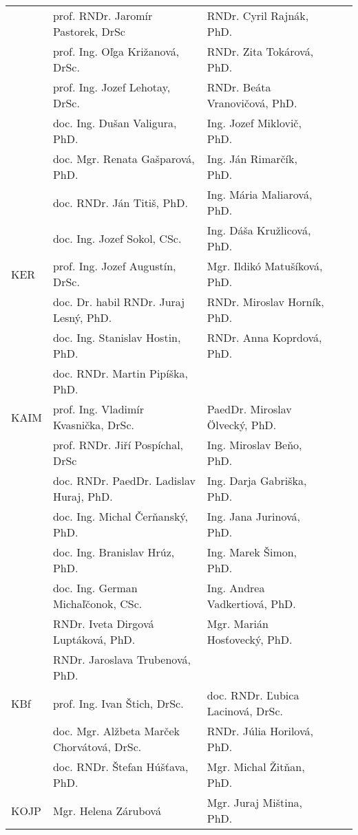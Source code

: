 \begin{table}
\begin{tabularx}{\textwidth}{lllll}
         & prof. RNDr. Jaromír Pastorek, DrSc         & RNDr. Cyril Rajnák, PhD.          \\
         & prof. Ing. Oľga Križanová, DrSc.           & RNDr. Zita Tokárová, PhD.         \\
         & prof. Ing. Jozef Lehotay, DrSc.            & RNDr. Beáta Vranovičová, PhD.     \\
         & doc. Ing. Dušan Valigura, PhD.             & Ing. Jozef Miklovič, PhD.         \\
         & doc. Mgr. Renata Gašparová, PhD.           & Ing. Ján Rimarčík, PhD.           \\
         & doc. RNDr. Ján Titiš, PhD.                 & Ing. Mária Maliarová, PhD.        \\
         & doc. Ing. Jozef Sokol, CSc.                & Ing. Dáša Kružlicová, PhD.        \\[2ex]
    KER  & prof. Ing. Jozef Augustín, DrSc.           & Mgr. Ildikó Matušíková, PhD.      \\
         & doc. Dr. habil RNDr. Juraj Lesný, PhD.     & RNDr. Miroslav Horník, PhD.       \\
         & doc. Ing. Stanislav Hostin, PhD.           & RNDr. Anna Koprdová, PhD.         \\
         & doc. RNDr. Martin Pipíška, PhD.            &                                   \\[2ex]
    KAIM & prof. Ing. Vladimír Kvasnička, DrSc.       & PaedDr. Miroslav Ölvecký, PhD.    \\
         & prof. RNDr. Jiří Pospíchal, DrSc           & Ing. Miroslav Beňo, PhD.          \\
         & doc. RNDr. PaedDr. Ladislav Huraj, PhD.    & Ing. Darja Gabriška, PhD.         \\
         & doc. Ing. Michal Čerňanský, PhD.           & Ing. Jana Jurinová, PhD.          \\
         & doc. Ing. Branislav Hrúz, PhD.             & Ing. Marek Šimon, PhD.            \\
         & doc. Ing. German Michaľčonok, CSc.         & Ing. Andrea Vadkertiová, PhD.     \\
         & RNDr. Iveta Dirgová Luptáková, PhD.        & Mgr. Marián Hosťovecký, PhD.      \\
         & RNDr. Jaroslava Trubenová, PhD.            &                                   \\[2ex]
    KBf  & prof. Ing. Ivan Štich, DrSc.               & doc. RNDr. Ľubica Lacinová, DrSc. \\
         & doc. Mgr. Alžbeta Marček Chorvátová, DrSc. & RNDr. Júlia Horilová, PhD.        \\
         & doc. RNDr. Štefan Húšťava, PhD.            & Mgr. Michal Žitňan, PhD.          \\[2ex]
    KOJP & Mgr. Helena Zárubová                       & Mgr. Juraj Miština, PhD.          \\[0.5ex]
    \bottomrule
  \end{tabularx}
\end{table}

